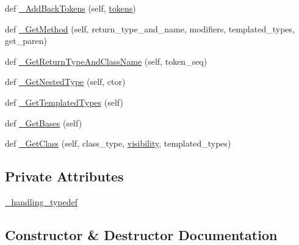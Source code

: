 \begin{DoxyCompactItemize}
\item 
def \mbox{\hyperlink{classscripts_1_1generator_1_1cpp_1_1ast_1_1_ast_builder_a53724c5eb9b24641a7cf0c2df7f5e1a9}{\+\_\+\+Add\+Back\+Tokens}} (self, \mbox{\hyperlink{classscripts_1_1generator_1_1cpp_1_1ast_1_1_ast_builder_a8bff715105a668075aeb9e9509623b21}{tokens}})
\item 
def \mbox{\hyperlink{classscripts_1_1generator_1_1cpp_1_1ast_1_1_ast_builder_a6c59b029707e66ee8b37973d31c0be97}{\+\_\+\+Get\+Method}} (self, return\+\_\+type\+\_\+and\+\_\+name, modifiers, templated\+\_\+types, get\+\_\+paren)
\item 
def \mbox{\hyperlink{classscripts_1_1generator_1_1cpp_1_1ast_1_1_ast_builder_a2d8f5ca3d40bdaee1e1471886e58a7c9}{\+\_\+\+Get\+Return\+Type\+And\+Class\+Name}} (self, token\+\_\+seq)
\item 
def \mbox{\hyperlink{classscripts_1_1generator_1_1cpp_1_1ast_1_1_ast_builder_a19cccd1bba1822af9899c38de6b32b77}{\+\_\+\+Get\+Nested\+Type}} (self, ctor)
\item 
def \mbox{\hyperlink{classscripts_1_1generator_1_1cpp_1_1ast_1_1_ast_builder_a780b3fdd303d7e6f3d3e8ef40896979e}{\+\_\+\+Get\+Templated\+Types}} (self)
\item 
def \mbox{\hyperlink{classscripts_1_1generator_1_1cpp_1_1ast_1_1_ast_builder_a1cb24f01bef9295c331ca893c6c046e4}{\+\_\+\+Get\+Bases}} (self)
\item 
def \mbox{\hyperlink{classscripts_1_1generator_1_1cpp_1_1ast_1_1_ast_builder_a72740ede2d525a858e745bb9f6c242b0}{\+\_\+\+Get\+Class}} (self, class\+\_\+type, \mbox{\hyperlink{classscripts_1_1generator_1_1cpp_1_1ast_1_1_ast_builder_a5bcdc6b1797cbb658a270387fa6373ef}{visibility}}, templated\+\_\+types)
\end{DoxyCompactItemize}
\subsection*{Private Attributes}
\begin{DoxyCompactItemize}
\item 
\mbox{\hyperlink{classscripts_1_1generator_1_1cpp_1_1ast_1_1_ast_builder_a88f10d7c81212a9697020d9edfa73408}{\+\_\+handling\+\_\+typedef}}
\end{DoxyCompactItemize}


\subsection{Constructor \& Destructor Documentation}
\mbox{\label{classscripts_1_1generator_1_1cpp_1_1ast_1_1_ast_builder_a2d3a5b858874aac95874950ba19bb9b5}} 
